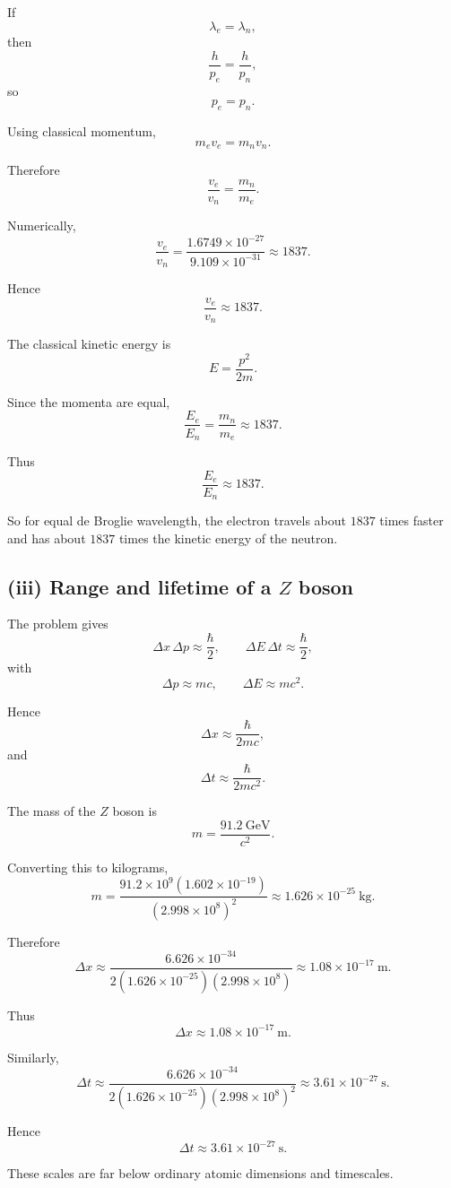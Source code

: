 \documentclass[11pt,a4paper]{article}
\begin{document}
If
\[
\lambda_e=\lambda_n,
\]
then
\[
\frac{h}{p_e}=\frac{h}{p_n},
\]
so
\[
p_e=p_n.
\]

Using classical momentum,
\[
m_ev_e=m_nv_n.
\]

Therefore
\[
\boxed{
\frac{v_e}{v_n}=\frac{m_n}{m_e}
}.
\]

Numerically,
\[
\frac{v_e}{v_n}
=
\frac{1.6749\times10^{-27}}
{9.109\times10^{-31}}
\approx1837.
\]

Hence
\[
\boxed{\frac{v_e}{v_n}\approx1837}.
\]

The classical kinetic energy is
\[
E=\frac{p^2}{2m}.
\]

Since the momenta are equal,
\[
\frac{E_e}{E_n}
=
\frac{m_n}{m_e}
\approx1837.
\]

Thus
\[
\boxed{\frac{E_e}{E_n}\approx1837}.
\]

So for equal de Broglie wavelength, the electron travels about $1837$ times
faster and has about $1837$ times the kinetic energy of the neutron.

\subsection{(iii) Range and lifetime of a $Z$ boson}

The problem gives
\[
\Delta x\,\Delta p\approx\frac{\hbar}{2},
\qquad
\Delta E\,\Delta t\approx\frac{\hbar}{2},
\]
with
\[
\Delta p\approx mc,
\qquad
\Delta E\approx mc^2.
\]

Hence
\[
\Delta x\approx\frac{\hbar}{2mc},
\]
and
\[
\Delta t\approx\frac{\hbar}{2mc^2}.
\]

The mass of the $Z$ boson is
\[
m=\frac{91.2\ \mathrm{GeV}}{c^2}.
\]

Converting this to kilograms,
\[
m
=
\frac{91.2\times10^9(1.602\times10^{-19})}
{(2.998\times10^8)^2}
\approx1.626\times10^{-25}\ \mathrm{kg}.
\]

Therefore
\[
\Delta x
\approx
\frac{6.626\times10^{-34}}
{2(1.626\times10^{-25})(2.998\times10^8)}
\approx1.08\times10^{-17}\ \mathrm m.
\]

Thus
\[
\boxed{\Delta x\approx1.08\times10^{-17}\ \mathrm m}.
\]

Similarly,
\[
\Delta t
\approx
\frac{6.626\times10^{-34}}
{2(1.626\times10^{-25})(2.998\times10^8)^2}
\approx3.61\times10^{-27}\ \mathrm s.
\]

Hence
\[
\boxed{\Delta t\approx3.61\times10^{-27}\ \mathrm s}.
\]

These scales are far below ordinary atomic dimensions and timescales.
\end{document}
